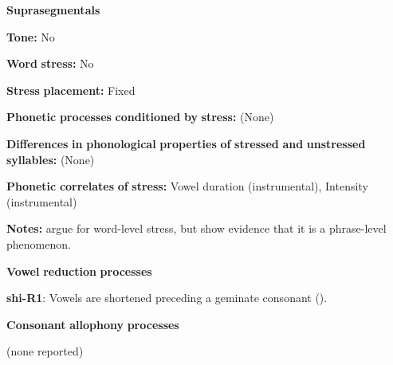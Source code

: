 \begin{styleBody}
\textbf{Suprasegmentals}
\end{styleBody}

\begin{styleBody}
\textbf{Tone:} No
\end{styleBody}

\begin{styleBody}
\textbf{Word} \textbf{stress:} No
\end{styleBody}

\begin{styleBody}
\textbf{Stress} \textbf{placement:} Fixed
\end{styleBody}

\begin{styleBody}
\textbf{Phonetic} \textbf{processes} \textbf{conditioned} \textbf{by} \textbf{stress:} (None)
\end{styleBody}

\begin{styleBody}
\textbf{Differences} \textbf{in} \textbf{phonological} \textbf{properties} \textbf{of} \textbf{stressed} \textbf{and} \textbf{unstressed} \textbf{syllables:} (None)
\end{styleBody}

\begin{styleBody}
\textbf{Phonetic} \textbf{correlates} \textbf{of} \textbf{stress:} Vowel duration (instrumental), Intensity (instrumental)
\end{styleBody}

\begin{styleBody}
\textbf{Notes:} \citet{GordonNafi2012} argue for word-level stress, but \citet{RoettgerEtAl2015} show evidence that it is a phrase-level phenomenon.
\end{styleBody}

\begin{styleBody}
\textbf{Vowel} \textbf{reduction} \textbf{processes}
\end{styleBody}

\begin{styleBody}
\textbf{shi-R1}: Vowels are shortened preceding a geminate consonant (\citealt{DellElmedlouai2002}).
\end{styleBody}

\begin{styleBody}
\textbf{Consonant} \textbf{allophony} \textbf{processes}
\end{styleBody}

\begin{styleBody}
(none reported)
\end{styleBody}

